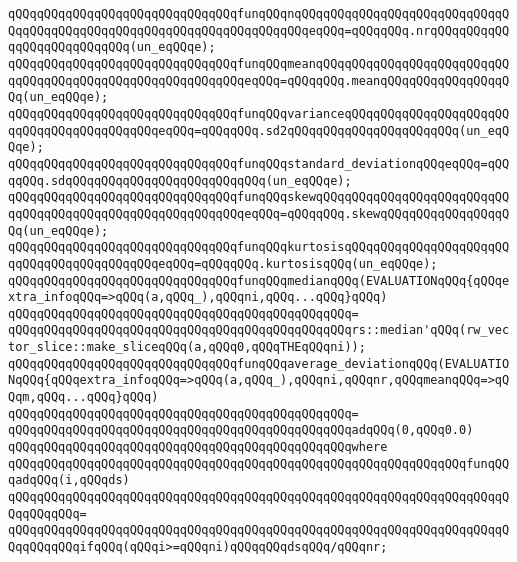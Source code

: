 \verb|qQQqqQQqqQQqqQQqqQQqqQQqqQQqqQQqfunqQQqnqQQqqQQqqQQqqQQqqQQqqQQqqQQqqQQqqQQqqQQqqQQqqQQqqQQqqQQqqQQqqQQqqQQqqQQqeqQQq=qQQqqQQq.nrqQQqqQQqqQQqqQQqqQQqqQQqqQQq(un_eqQQqe);|\newline
\verb|qQQqqQQqqQQqqQQqqQQqqQQqqQQqqQQqfunqQQqmeanqQQqqQQqqQQqqQQqqQQqqQQqqQQqqQQqqQQqqQQqqQQqqQQqqQQqqQQqqQQqeqQQq=qQQqqQQq.meanqQQqqQQqqQQqqQQqqQQq(un_eqQQqe);|\newline
\verb|qQQqqQQqqQQqqQQqqQQqqQQqqQQqqQQqfunqQQqvarianceqQQqqQQqqQQqqQQqqQQqqQQqqQQqqQQqqQQqqQQqqQQqeqQQq=qQQqqQQq.sd2qQQqqQQqqQQqqQQqqQQqqQQq(un_eqQQqe);|\newline
\verb|qQQqqQQqqQQqqQQqqQQqqQQqqQQqqQQqfunqQQqstandard_deviationqQQqeqQQq=qQQqqQQq.sdqQQqqQQqqQQqqQQqqQQqqQQqqQQq(un_eqQQqe);|\newline
\verb|qQQqqQQqqQQqqQQqqQQqqQQqqQQqqQQqfunqQQqskewqQQqqQQqqQQqqQQqqQQqqQQqqQQqqQQqqQQqqQQqqQQqqQQqqQQqqQQqqQQqeqQQq=qQQqqQQq.skewqQQqqQQqqQQqqQQqqQQq(un_eqQQqe);|\newline
\verb|qQQqqQQqqQQqqQQqqQQqqQQqqQQqqQQqfunqQQqkurtosisqQQqqQQqqQQqqQQqqQQqqQQqqQQqqQQqqQQqqQQqqQQqeqQQq=qQQqqQQq.kurtosisqQQq(un_eqQQqe);|\newline
\newline
\verb|qQQqqQQqqQQqqQQqqQQqqQQqqQQqqQQqfunqQQqmedianqQQq(EVALUATIONqQQq{qQQqextra_infoqQQq=>qQQq(a,qQQq_),qQQqni,qQQq...qQQq}qQQq)|\newline
\verb|qQQqqQQqqQQqqQQqqQQqqQQqqQQqqQQqqQQqqQQqqQQqqQQq=|\newline
\verb|qQQqqQQqqQQqqQQqqQQqqQQqqQQqqQQqqQQqqQQqqQQqqQQqrs::median'qQQq(rw_vector_slice::make_sliceqQQq(a,qQQq0,qQQqTHEqQQqni));|\newline
\newline
\verb|qQQqqQQqqQQqqQQqqQQqqQQqqQQqqQQqfunqQQqaverage_deviationqQQq(EVALUATIONqQQq{qQQqextra_infoqQQq=>qQQq(a,qQQq_),qQQqni,qQQqnr,qQQqmeanqQQq=>qQQqm,qQQq...qQQq}qQQq)|\newline
\verb|qQQqqQQqqQQqqQQqqQQqqQQqqQQqqQQqqQQqqQQqqQQqqQQq=|\newline
\verb|qQQqqQQqqQQqqQQqqQQqqQQqqQQqqQQqqQQqqQQqqQQqqQQqadqQQq(0,qQQq0.0)|\newline
\verb|qQQqqQQqqQQqqQQqqQQqqQQqqQQqqQQqqQQqqQQqqQQqqQQqwhere|\newline
\verb|qQQqqQQqqQQqqQQqqQQqqQQqqQQqqQQqqQQqqQQqqQQqqQQqqQQqqQQqqQQqqQQqfunqQQqadqQQq(i,qQQqds)|\newline
\verb|qQQqqQQqqQQqqQQqqQQqqQQqqQQqqQQqqQQqqQQqqQQqqQQqqQQqqQQqqQQqqQQqqQQqqQQqqQQqqQQq=|\newline
\verb|qQQqqQQqqQQqqQQqqQQqqQQqqQQqqQQqqQQqqQQqqQQqqQQqqQQqqQQqqQQqqQQqqQQqqQQqqQQqqQQqifqQQq(qQQqi>=qQQqni)qQQqqQQqdsqQQq/qQQqnr;|\newline
